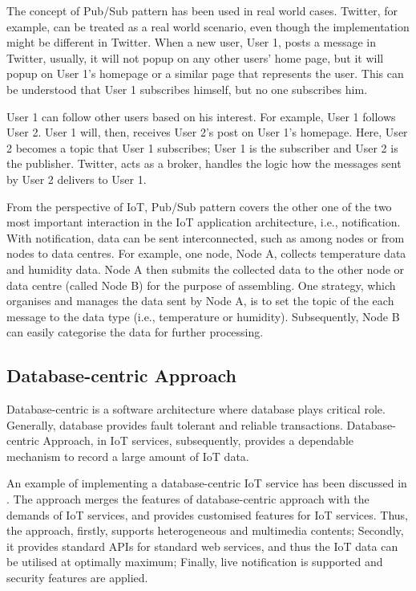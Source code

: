 The concept of Pub/Sub pattern has been used in real world cases. Twitter, for example, can be treated as a real world scenario, even though the implementation might be different in Twitter. When a new user, User 1, posts a message in Twitter, usually, it will not popup on any other users' home page, but it will popup on User 1's homepage or a similar page that represents the user. This can be understood that User 1 subscribes himself, but no one subscribes him. 

User 1 can follow other users based on his interest. For example, User 1 follows User 2. User 1 will, then, receives User 2's post on User 1's homepage. Here, User 2 becomes a topic that User 1 subscribes; User 1 is the subscriber and User 2 is the publisher. Twitter, acts as a broker, handles the logic how the messages sent by User 2 delivers to User 1.

From the perspective of IoT, Pub/Sub pattern covers the other one of the two most important interaction in the IoT application architecture, i.e., notification. With notification, data can be sent interconnected, such as among nodes or from nodes to data centres. For example, one node, Node A, collects temperature data and humidity data. Node A then submits the collected data to the other node or data centre (called Node B) for the purpose of assembling. One strategy, which organises and manages the data sent by Node A, is to set the topic of the each message to the data type (i.e., temperature or humidity). Subsequently, Node B can easily categorise the data for further processing.

\subsection{Database-centric Approach}

Database-centric is a software architecture where database plays critical role. Generally, database provides fault tolerant and reliable transactions. Database-centric Approach, in IoT services, subsequently, provides a dependable mechanism to record a large amount of IoT data. 

An example of implementing a database-centric IoT service has been discussed in \cite{francesco2012storage}. The approach merges the features of database-centric approach with the demands of IoT services, and provides customised features for IoT services. Thus, the approach, firstly, supports heterogeneous and multimedia contents; Secondly, it provides standard APIs for standard web services, and thus the IoT data can be utilised at optimally maximum; Finally, live notification is supported and security features are applied.


